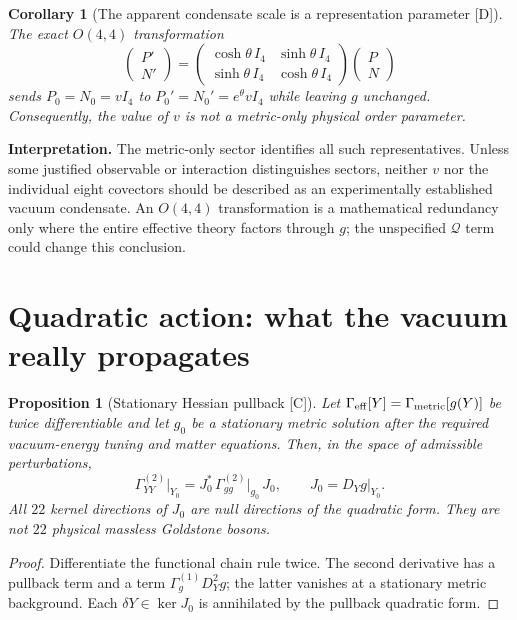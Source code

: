 \documentclass[11pt,a4paper]{article}
\newtheorem{proposition}[theorem]{Proposition}
\newtheorem{corollary}[theorem]{Corollary}
\theoremstyle{definition}\newtheorem{definition}[theorem]{Definition}
\theoremstyle{remark}\newtheorem{remark}[theorem]{Remark}
\newcommand{\Dtag}{\textsf{[D]}}
\newcommand{\Ctag}{\textsf{[C]}}
\newcommand{\kerop}{\operatorname{ker}}
\begin{document}
\begin{corollary}[The apparent condensate scale is a representation parameter \Dtag]\label{cor:v}
The exact $O(4,4)$ transformation
\begin{equation}\label{eq:boost}
\begin{pmatrix}P'\\N'\end{pmatrix}=\begin{pmatrix}
\cosh\theta\,I_4&\sinh\theta\,I_4\\
\sinh\theta\,I_4&\cosh\theta\,I_4
\end{pmatrix}\begin{pmatrix}P\\N\end{pmatrix}
\end{equation}
sends $P_0=N_0=vI_4$ to $P_0'=N_0'=e^{\theta}vI_4$ while leaving $g$ unchanged. Consequently, the value of $v$ is not a metric-only physical order parameter.
\end{corollary}

\textbf{Interpretation.} The metric-only sector identifies all such representatives. Unless some justified observable or interaction distinguishes sectors, neither $v$ nor the individual eight covectors should be described as an experimentally established vacuum condensate. An $O(4,4)$ transformation is a mathematical redundancy only where the entire effective theory factors through $g$; the unspecified $\mathcal Q$ term could change this conclusion.

\section{Quadratic action: what the vacuum really propagates}
\begin{proposition}[Stationary Hessian pullback \Ctag]\label{prop:hess}
Let $\Gamma_{\rm eff}[Y]=\Gamma_{\rm metric}[g(Y)]$ be twice differentiable and let $g_0$ be a stationary metric solution after the required vacuum-energy tuning and matter equations. Then, in the space of admissible perturbations,
\begin{equation}\label{eq:hess}
\boxed{\Gamma_{YY}^{(2)}\big|_{Y_0}=J_0^{*}\,\Gamma_{gg}^{(2)}\big|_{g_0}\,J_0,\qquad J_0=D_Yg\big|_{Y_0}.}
\end{equation}
All $22$ kernel directions of $J_0$ are null directions of the quadratic form. They are \emph{not} $22$ physical massless Goldstone bosons.
\end{proposition}
\begin{proof} Differentiate the functional chain rule twice. The second derivative has a pullback term and a term $\Gamma_g^{(1)}D_Y^2g$; the latter vanishes at a stationary metric background. Each $\delta Y\in\kerop J_0$ is annihilated by the pullback quadratic form.\end{proof}
\end{document}
